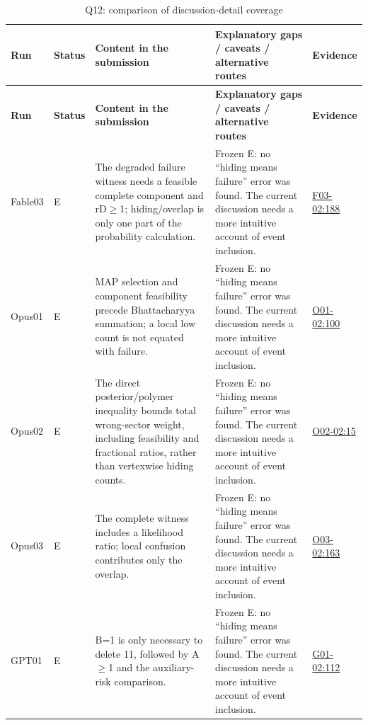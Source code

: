 \documentclass[11pt,a4paper]{article}
\begin{document}
{\fontsize{9.0}{12.6}\selectfont
\setlength{\tabcolsep}{2.5pt}
\begin{longtable}{>{\raggedright\arraybackslash}p{}>{\raggedright\arraybackslash}p{}>{\raggedright\arraybackslash}p{}>{\raggedright\arraybackslash}p{}>{\raggedright\arraybackslash}p{}}
\caption{Q12: comparison of discussion-detail coverage}\\
\toprule
\textbf{Run} & \textbf{Status} & \textbf{Content in the submission} & \textbf{Explanatory gaps /\allowbreak{} caveats /\allowbreak{} alternative routes} & \textbf{Evidence}\tabularnewline
\midrule
\endfirsthead
\toprule
\textbf{Run} & \textbf{Status} & \textbf{Content in the submission} & \textbf{Explanatory gaps /\allowbreak{} caveats /\allowbreak{} alternative routes} & \textbf{Evidence}\tabularnewline
\midrule
\endhead
{}Fable03 & E & The degraded failure witness needs a feasible complete component and rD\ensuremath{\geq}1; hiding/\allowbreak{}overlap is only one part of the probability calculation. & Frozen E: no “hiding means failure” error was found. The current discussion needs a more intuitive account of event inclusion. & \hyperref[src:F03-02]{F03-02:188}\tabularnewline
{}Opus01 & E & MAP selection and component feasibility precede Bhattacharyya summation; a local low count is not equated with failure. & Frozen E: no “hiding means failure” error was found. The current discussion needs a more intuitive account of event inclusion. & \hyperref[src:O01-02]{O01-02:100}\tabularnewline
{}Opus02 & E & The direct posterior/\allowbreak{}polymer inequality bounds total wrong-sector weight,\allowbreak{} including feasibility and fractional ratios,\allowbreak{} rather than vertexwise hiding counts. & Frozen E: no “hiding means failure” error was found. The current discussion needs a more intuitive account of event inclusion. & \hyperref[src:O02-02]{O02-02:15}\tabularnewline
{}Opus03 & E & The complete witness includes a likelihood ratio; local confusion contributes only the overlap. & Frozen E: no “hiding means failure” error was found. The current discussion needs a more intuitive account of event inclusion. & \hyperref[src:O03-02]{O03-02:163}\tabularnewline
{}GPT01 & E & B=1 is only necessary to delete 11,\allowbreak{} followed by A\ensuremath{\geq}1 and the auxiliary-risk comparison. & Frozen E: no “hiding means failure” error was found. The current discussion needs a more intuitive account of event inclusion. & \hyperref[src:G01-02]{G01-02:112}\tabularnewline

\end{longtable}}
\end{document}

